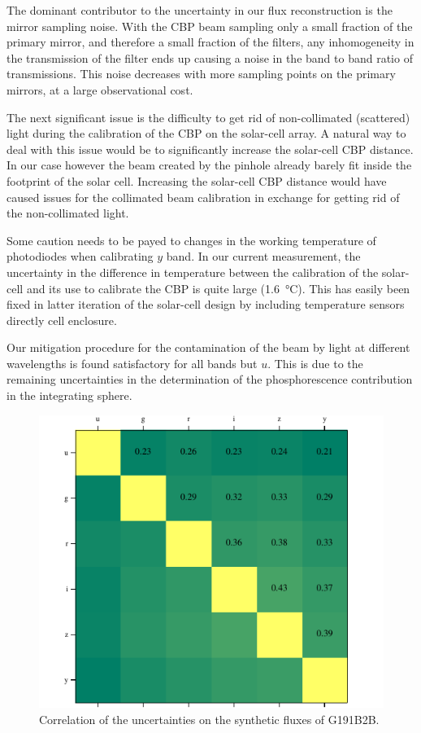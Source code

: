 The dominant contributor to the uncertainty in our flux reconstruction
is the mirror sampling noise. With the CBP beam sampling only a small
fraction of the primary mirror, and therefore a small fraction of the
filters, any inhomogeneity in the transmission of the filter ends up
causing a noise in the band to band ratio of transmissions. This noise
decreases with more sampling points on the primary mirrors, at a large
observational cost.

The next significant issue is the difficulty to get rid of
non-collimated (scattered) light during the calibration of the CBP on
the solar-cell array. A natural way to deal with this issue would be
to significantly increase the solar-cell CBP distance. In our case
however the beam created by the \bpinhole pinhole already barely fit
inside the footprint of the solar cell. Increasing the solar-cell CBP
distance would have caused issues for the collimated beam calibration in exchange
for getting rid of the non-collimated light.

Some caution needs to be payed to changes in the working temperature
of photodiodes when calibrating $y$ band. In our current measurement,
the uncertainty in the difference in temperature between the
calibration of the solar-cell and its use to calibrate the CBP is
quite large (\SI{1.6}{\celsius}). This has easily been fixed in latter
iteration of the solar-cell design by including temperature sensors
directly cell enclosure.

Our mitigation procedure for the contamination of the beam by light
at different wavelengths is found satisfactory for all bands but $u$. This
is due to the remaining uncertainties in the determination of the
phosphorescence contribution in the integrating sphere.

\begin{figure}
  \centering
  \includegraphics[width=1\linewidth]{fig/bandcorrelation.pdf}
  \caption{Correlation of the uncertainties on the synthetic fluxes of G191B2B.}
  \label{fig:correlation}
\end{figure}


